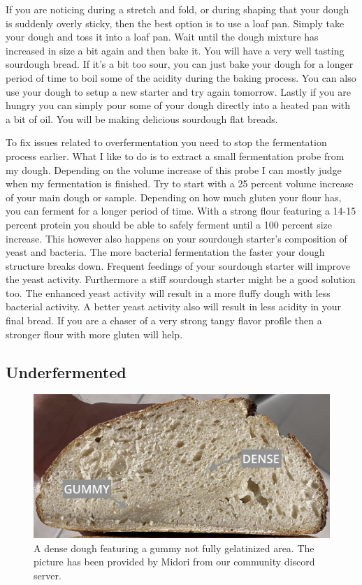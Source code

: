 If you are noticing during a stretch and fold, or during shaping that your dough
is suddenly overly sticky, then the best option is to use a loaf pan. Simply take
your dough and toss it into a loaf pan. Wait until the dough mixture has increased
in size a bit again and then bake it. You will have a very well tasting sourdough
bread. If it's a bit too sour, you can just bake your dough for a longer period
of time to boil some of the acidity during the baking process. You can also use
your dough to setup a new starter and try again tomorrow. Lastly if you are hungry
you can simply pour some of your dough directly into a heated pan with a bit of
oil. You will be making delicious sourdough flat breads.

To fix issues related to overfermentation you need to stop the fermentation process
earlier. What I like to do is to extract a small fermentation probe from my dough.
Depending on the volume increase of this probe I can mostly judge when my fermentation
is finished. Try to start with a 25 percent volume increase of your main dough or sample.
Depending on how much gluten your flour has, you can ferment for a longer period of time.
With a strong flour featuring a 14-15 percent protein you should be able to safely
ferment until a 100 percent size increase. This however also happens on your
sourdough starter's composition of yeast and bacteria. The more bacterial fermentation
the faster your dough structure breaks down. Frequent feedings of your sourdough
starter will improve the yeast activity. Furthermore a stiff sourdough starter
might be a good solution too. The enhanced yeast activity will result in a more fluffy
dough with less bacterial activity. A better yeast activity also will result
in less acidity in your final bread. If you are a chaser of a very strong tangy
flavor profile then a stronger flour with more gluten will help.


\subsection{Underfermented}

\begin{figure}
  \includegraphics[width=\textwidth]{fermented-too-short-underbaked}
  \caption{A dense dough featuring a gummy not fully gelatinized area.
  The picture has been provided by Midori from our community discord server.}
  \label{fig:fermented-too-short-underbaked}
\end{figure}

